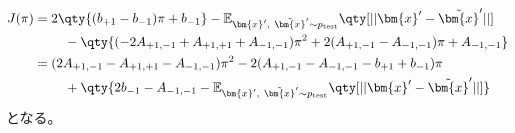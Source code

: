 \documentclass[class=jsarticle, crop=false, dvipdfmx, fleqn]{standalone}
\begin{document}
\begin{align*}
    J(\pi)
        & = 2 \qty{(b_{+1} - b_{-1}) \pi + b_{-1}}
            - \mathbb{E}_{\bm{x}',\ \tilde{\bm{x}}' \sim p_\mathrm{test}} \qty[||\bm{x}' - \tilde{\bm{x}}'||] \\
        & \ \qquad
            - \qty{
                (-2 A_{+1, -1} + A_{+1, +1} + A_{-1, -1}) \pi^2
                + 2 (A_{+1, -1} - A_{-1, -1}) \pi
                + A_{-1, -1}
                } \\
        & = (2 A_{+1, -1} - A_{+1, +1} - A_{-1, -1}) \pi^2
            - 2 (A_{+1, -1} - A_{-1, -1} - b_{+1} + b_{-1}) \pi \\
        & \ \qquad
            + \qty{2b_{-1} - A_{-1, -1} - \mathbb{E}_{\bm{x}',\ \tilde{\bm{x}}' \sim p_\mathrm{test}} \qty[||\bm{x}' - \tilde{\bm{x}}'||]}
\end{align*}
となる。
\end{document}
